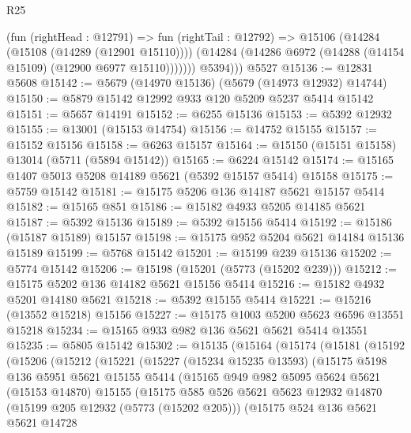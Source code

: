 \begin{lexlean}{R25}
\begin{coremodule}
            (fun (rightHead : @12791) =>
            fun (rightTail : @12792) =>
            @15106
              (@14284 (@15108 (@14289 (@12901 @15110))))
              (@14284 (@14286 @6972 (@14288 (@14154 @15109) (@12900 @6977 @15110)))))))
          @5394)))
    @5527
@15136 := @12831 @5608
@15142 := @5679 (@14970 @15136) (@5679 (@14973 @12932) @14744)
@15150 := @5879 @15142 @12992 @933 @120 @5209 @5237 @5414 @15142
@15151 := @5657 @14191
@15152 := @6255 @15136
@15153 := @5392 @12932
@15155 := @13001 (@15153 @14754)
@15156 := @14752 @15155
@15157 := @15152 @15156
@15158 := @6263 @15157
@15164 := @15150 (@15151 @15158) @13014 (@5711 (@5894 @15142))
@15165 := @6224 @15142
@15174 := @15165 @1407 @5013 @5208 @14189 @5621 (@5392 @15157 @5414) @15158
@15175 := @5759 @15142
@15181 := @15175 @5206 @136 @14187 @5621 @15157 @5414
@15182 := @15165 @851
@15186 := @15182 @4933 @5205 @14185 @5621
@15187 := @5392 @15136
@15189 := @5392 @15156 @5414
@15192 := @15186 (@15187 @15189) @15157
@15198 := @15175 @952 @5204 @5621 @14184 @15136 @15189
@15199 := @5768 @15142
@15201 := @15199 @239 @15136
@15202 := @5774 @15142
@15206 := @15198 (@15201 (@5773 (@15202 @239)))
@15212 := @15175 @5202 @136 @14182 @5621 @15156 @5414
@15216 := @15182 @4932 @5201 @14180 @5621
@15218 := @5392 @15155 @5414
@15221 := @15216 (@13552 @15218) @15156
@15227 := @15175 @1003 @5200 @5623 @6596 @13551 @15218
@15234 := @15165 @933 @982 @136 @5621 @5621 @5414 @13551
@15235 := @5805 @15142
@15302 := @15135
    (@15164
      (@15174
        (@15181
          (@15192
            (@15206
              (@15212
                (@15221
                  (@15227
                    (@15234 @15235 @13593)
                    (@15175
                      @5198
                      @136
                      @5951
                      @5621
                      @15155
                      @5414
                      (@15165
                        @949
                        @982
                        @5095
                        @5624
                        @5621
                        (@15153 @14870)
                        @15155
                        (@15175
                          @585
                          @526
                          @5621
                          @5623
                          @12932
                          @14870
                          (@15199 @205 @12932 (@5773 (@15202 @205)))
                          (@15175
                            @524
                            @136
                            @5621
                            @5621
                            @14728

\end{coremodule}
\end{lexlean}
